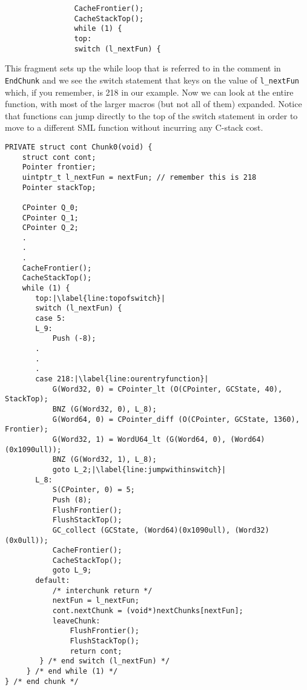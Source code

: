 \begin{minipage}{\linewidth}
\lstset{language=C}\begin{lstlisting}
                CacheFrontier();
                CacheStackTop();
                while (1) {
                top:
                switch (l_nextFun) {
\end{lstlisting}
\end{minipage}

This fragment sets up the while loop that is referred to in the comment in \texttt{EndChunk} and we see the switch statement that keys on the value of \texttt{l\_nextFun} which, if you remember, is 218 in our example. Now we can look at the entire function, with most of the larger macros (but not all of them) expanded. Notice that functions can jump directly to the top of the switch statement in order to move to a different SML function without incurring any C-stack cost.

\lstset{language=C,escapechar=|}\begin{lstlisting}
PRIVATE struct cont Chunk0(void) {
    struct cont cont;
    Pointer frontier;
    uintptr_t l_nextFun = nextFun; // remember this is 218
    Pointer stackTop;
 
    CPointer Q_0;
    CPointer Q_1;
    CPointer Q_2;
	.
	.
	.
    CacheFrontier();
    CacheStackTop();
    while (1) {
       top:|\label{line:topofswitch}|
       switch (l_nextFun) {
       case 5:
       L_9:
           Push (-8);
	   .
	   .
	   .
       case 218:|\label{line:ourentryfunction}|
           G(Word32, 0) = CPointer_lt (O(CPointer, GCState, 40), StackTop);
           BNZ (G(Word32, 0), L_8);
           G(Word64, 0) = CPointer_diff (O(CPointer, GCState, 1360), Frontier);
           G(Word32, 1) = WordU64_lt (G(Word64, 0), (Word64)(0x1090ull));
           BNZ (G(Word32, 1), L_8);
           goto L_2;|\label{line:jumpwithinswitch}|
       L_8:
           S(CPointer, 0) = 5;
           Push (8);
           FlushFrontier();
           FlushStackTop();
           GC_collect (GCState, (Word64)(0x1090ull), (Word32)(0x0ull));
           CacheFrontier();
           CacheStackTop();
           goto L_9;
       default:
           /* interchunk return */
           nextFun = l_nextFun;
           cont.nextChunk = (void*)nextChunks[nextFun];
           leaveChunk:
               FlushFrontier();
               FlushStackTop();
               return cont;
        } /* end switch (l_nextFun) */
     } /* end while (1) */
} /* end chunk */	
\end{lstlisting}

